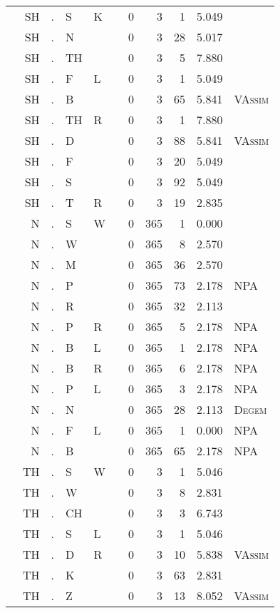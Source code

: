 \begin{longtable}{r@{ } r@{ } c@{ } l@{ } l@{ } l@{ } r r r r l }
 & SH & . & S & K &  & 0 & 3 & 1 & 5.049 &  \\
 & SH & . & N &  &  & 0 & 3 & 28 & 5.017 &  \\
 & SH & . & TH &  &  & 0 & 3 & 5 & 7.880 &  \\
 & SH & . & F & L &  & 0 & 3 & 1 & 5.049 &  \\
 & SH & . & B &  &  & 0 & 3 & 65 & 5.841 & \textsc{VAssim} \\
 & SH & . & TH & R &  & 0 & 3 & 1 & 7.880 &  \\
 & SH & . & D &  &  & 0 & 3 & 88 & 5.841 & \textsc{VAssim} \\
 & SH & . & F &  &  & 0 & 3 & 20 & 5.049 &  \\
 & SH & . & S &  &  & 0 & 3 & 92 & 5.049 &  \\
 & SH & . & T & R &  & 0 & 3 & 19 & 2.835 &  \\
 & N & . & S & W &  & 0 & 365 & 1 & 0.000 &  \\
 & N & . & W &  &  & 0 & 365 & 8 & 2.570 &  \\
 & N & . & M &  &  & 0 & 365 & 36 & 2.570 &  \\
 & N & . & P &  &  & 0 & 365 & 73 & 2.178 & \textsc{NPA} \\
 & N & . & R &  &  & 0 & 365 & 32 & 2.113 &  \\
 & N & . & P & R &  & 0 & 365 & 5 & 2.178 & \textsc{NPA} \\
 & N & . & B & L &  & 0 & 365 & 1 & 2.178 & \textsc{NPA} \\
 & N & . & B & R &  & 0 & 365 & 6 & 2.178 & \textsc{NPA} \\
 & N & . & P & L &  & 0 & 365 & 3 & 2.178 & \textsc{NPA} \\
 & N & . & N &  &  & 0 & 365 & 28 & 2.113 & \textsc{Degem} \\
 & N & . & F & L &  & 0 & 365 & 1 & 0.000 & \textsc{NPA} \\
 & N & . & B &  &  & 0 & 365 & 65 & 2.178 & \textsc{NPA} \\
 & TH & . & S & W &  & 0 & 3 & 1 & 5.046 &  \\
 & TH & . & W &  &  & 0 & 3 & 8 & 2.831 &  \\
 & TH & . & CH &  &  & 0 & 3 & 3 & 6.743 &  \\
 & TH & . & S & L &  & 0 & 3 & 1 & 5.046 &  \\
 & TH & . & D & R &  & 0 & 3 & 10 & 5.838 & \textsc{VAssim} \\
 & TH & . & K &  &  & 0 & 3 & 63 & 2.831 &  \\
 & TH & . & Z &  &  & 0 & 3 & 13 & 8.052 & \textsc{VAssim} \\

\end{longtable}
